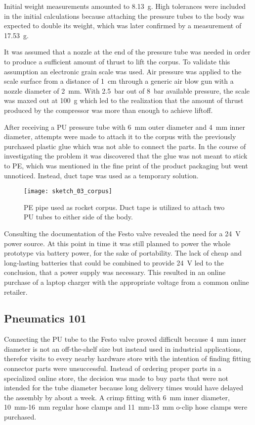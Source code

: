Initial weight measurements amounted to \SI{8,13}{\gram}. High tolerances were included in the initial calculations because attaching the pressure tubes to the body was expected to double its weight, which was later confirmed by a measurement of \SI{17,53}{\gram}.

It was assumed that a nozzle at the end of the pressure tube was needed in order to produce a sufficient amount of thrust to lift the corpus.
To validate this assumption an electronic grain scale was used. Air pressure was applied to the scale surface from a distance of \SI{1}{\centi\meter} through a generic air blow gun with a nozzle diameter of \SI{2}{\milli\meter}. With \SI{2,5}{\bar} out of \SI{8}{\bar} available pressure, the scale was maxed out at \SI{100}{\gram} which led to the realization that the amount of thrust produced by the compressor was more than enough to achieve liftoff. 


After receiving a PU pressure tube with \SI{6}{\milli\meter} outer diameter and \SI{4}{\milli\meter} inner diameter, attempts were made to attach it to the corpus with the previously purchased plastic glue which was not able to connect the parts. In the course of investigating the problem it was discovered that the glue was not meant to stick to PE, which was mentioned in the fine print of the product packaging but went unnoticed. Instead, duct tape was used as a temporary solution. 

\begin{figure}[H]
\centering

\texttt{[image: sketch\_03\_corpus]}

\caption{PE pipe used as rocket corpus. Duct tape is utilized to attach two PU tubes to either side of the body.}
\end{figure}

Consulting the documentation of the Festo valve revealed the need for a \SI{24}{\volt} power source. At this point in time it was still planned to power the whole prototype via battery power, for the sake of portability. The lack of cheap and long-lasting batteries that could be combined to provide \SI{24}{\volt} led to the conclusion, that a power supply was necessary. This resulted in an online purchase of a laptop charger \cite{power-supply} with the appropriate voltage from a common online retailer.

\subsection{Pneumatics 101}
Connecting the PU tube to the Festo valve proved difficult because \SI{4}{\milli\meter} inner diameter is not an off-the-shelf size but instead used in industrial applications, therefor visits to every nearby hardware store with the intention of finding fitting connector parts were unsuccessful. Instead of ordering proper parts in a specialized online store, the decision was made to buy parts that were not intended for the tube diameter because long delivery times would have delayed the assembly by about a week. A crimp fitting with \SI{6}{\milli\meter} inner diameter, \SI{10}{\milli\meter}-\SI{16}{\milli\meter} regular hose clamps and \SI{11}{\milli\meter}-\SI{13}{\milli\meter} o-clip hose clamps were purchased. 

